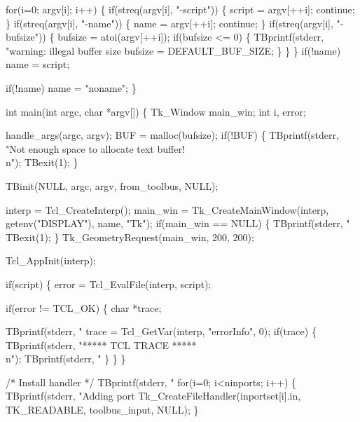   for(i=0; argv[i]; i++) \{
    if(streq(argv[i], "-script")) \{
      script = argv[++i];
      continue;
    \}
    if(streq(argv[i], "-name")) \{
      name = argv[++i];
      continue;
    \}
    if(streq(argv[i], "-bufsize")) \{
      bufsize = atoi(argv[++i]);
      if(bufsize <= 0) \{
        TBprintf(stderr, "warning: illegal buffer size %
        bufsize = DEFAULT_BUF_SIZE;
      \}
    \}
  \}
  if(!name)
    name = script;

  if(!name)
    name = "noname";
\}
\nwendcode{}\nwdocspar


\nwenddocs{}\endmoddef\let\nwnotused=\nwoutput{}\nwstartdeflinemarkup{}\nwenddeflinemarkup
int main(int argc, char *argv[])
\{
  Tk_Window main_win;
  int i, error;

  handle_args(argc, argv);
  BUF = malloc(bufsize);
  if(!BUF) \{
    TBprintf(stderr, "Not enough space to allocate text buffer!\\n");
    TBexit(1);
  \}

  TBinit(NULL, argc, argv, from_toolbus, NULL);

  interp = Tcl_CreateInterp();
  main_win = Tk_CreateMainWindow(interp, getenv("DISPLAY"), name, "Tk");
  if(main_win == NULL) \{
    TBprintf(stderr, "%
    TBexit(1);
  \}
  Tk_GeometryRequest(main_win, 200, 200);

  Tcl_AppInit(interp);

  if(script) \{
    error = Tcl_EvalFile(interp, script);
 
    if(error != TCL_OK) \{
      char *trace;

      TBprintf(stderr, "%
      trace = Tcl_GetVar(interp, "errorInfo", 0);
      if(trace) \{
        TBprintf(stderr, "***** TCL TRACE *****\\n");
        TBprintf(stderr, "%
      \}
    \}
  \}

  /* Install handler */
  TBprintf(stderr, "%
  for(i=0; i<ninports; i++) \{
    TBprintf(stderr, "Adding port %
    Tk_CreateFileHandler(inportset[i].in, TK_READABLE, toolbus_input, NULL);
  \}  
  
